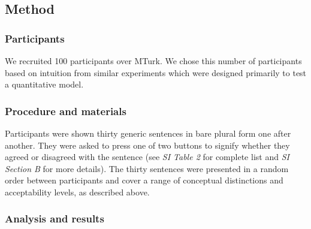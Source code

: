 \documentclass[12pt,letterpaper]{article}
\newcommand{\ndg}[1]{\textcolor{Green}{[ndg: #1]}}
\begin{document}
\subsection*{Method}

\subsubsection*{Participants}

We recruited 100 participants over MTurk. 
We chose this number of participants based on intuition from similar experiments which were designed primarily to test a quantitative model.

\subsubsection*{Procedure and materials}

Participants were shown thirty generic sentences in bare plural form one after another. 
They were asked to press one of two buttons to signify whether they agreed or disagreed with the sentence (see {\it SI Table 2} for complete list and {\it SI Section B} for more details). 
The thirty sentences were presented in a random order between participants and cover a range of conceptual distinctions and acceptability levels, as described above.


\subsubsection*{Analysis and results}
 
\end{document}
